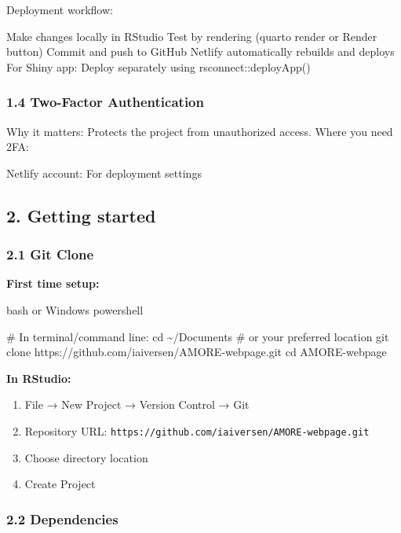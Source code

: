 \documentclass[
  letterpaper,
  DIV=11,
  numbers=noendperiod]{scrartcl}
\newenvironment{Shaded}{\begin{snugshade}}{\end{snugshade}}
\newcommand{\BuiltInTok}[1]{\textcolor[rgb]{0.00,0.23,0.31}{#1}}
\newcommand{\CommentTok}[1]{\textcolor[rgb]{0.37,0.37,0.37}{#1}}
\newcommand{\FunctionTok}[1]{\textcolor[rgb]{0.28,0.35,0.67}{#1}}
\newcommand{\NormalTok}[1]{\textcolor[rgb]{0.00,0.23,0.31}{#1}}
\begin{document}
Deployment workflow:

Make changes locally in RStudio Test by rendering (quarto render or
Render button) Commit and push to GitHub Netlify automatically rebuilds
and deploys For Shiny app: Deploy separately using
rsconnect::deployApp()

\subsubsection{1.4 Two-Factor
Authentication}\label{two-factor-authentication}

Why it matters: Protects the project from unauthorized access. Where you
need 2FA:

Netlify account: For deployment settings

\subsection{2. Getting started}\label{getting-started}

\subsubsection{2.1 Git Clone}\label{git-clone}

\textbf{First time setup:}

bash or Windows powershell

\begin{Shaded}
\begin{Highlighting}[]
\CommentTok{\# In terminal/command line:}
\BuiltInTok{cd}\NormalTok{ \textasciitilde{}/Documents  }\CommentTok{\# or your preferred location}
\FunctionTok{git}\NormalTok{ clone https://github.com/iaiversen/AMORE{-}webpage.git}
\BuiltInTok{cd}\NormalTok{ AMORE{-}webpage}
\end{Highlighting}
\end{Shaded}

\textbf{In RStudio:}

\begin{enumerate}
\def\labelenumi{\arabic{enumi}.}
\item
  File → New Project → Version Control → Git
\item
  Repository URL:
  \texttt{https://github.com/iaiversen/AMORE-webpage.git}
\item
  Choose directory location
\item
  Create Project
\end{enumerate}

\subsubsection{2.2 Dependencies}\label{dependencies}
\end{document}
